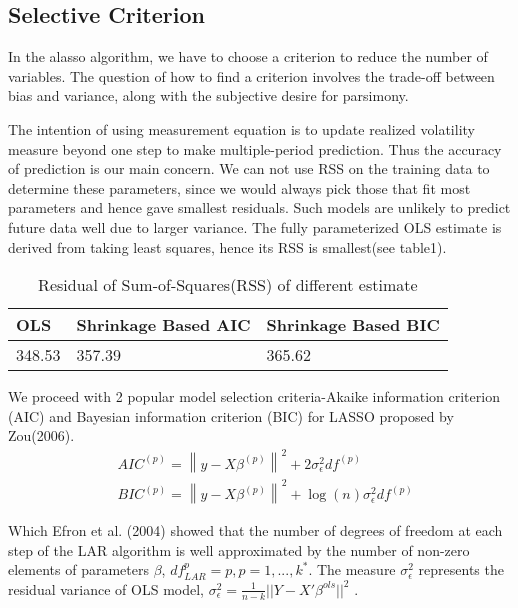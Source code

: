 \documentclass[titlepage,11pt]{article}
\begin{document}
\subsection{Selective Criterion}

In the alasso algorithm, we have to choose a criterion to reduce the number of variables. The question of how to find a criterion involves the trade-off between bias and variance, along with the subjective desire for parsimony. 

The intention of using measurement equation is to update realized volatility measure beyond one step to make multiple-period prediction. Thus the accuracy of prediction is our main concern. 
We can not use RSS on the training data to determine these parameters, since we would always pick those that fit most parameters and hence gave smallest residuals. Such models are unlikely to predict future data well due to larger variance. The fully parameterized OLS estimate is derived from taking least squares, hence its RSS is smallest(see table1). 
\begin{table} [!htbp]


\begin{tabular}{|p{4cm}|p{4cm}|p{4cm}|}
	  
	\hline OLS  & Shrinkage Based AIC  & Shrinkage Based BIC \\ 
	\hline 348.53  & 357.39 & 365.62 \\ 
	\hline 
\end{tabular} 
\captionsetup{justification=raggedright,singlelinecheck=false}
\caption{ Residual of Sum-of-Squares(RSS) of different estimate}
\label{RSS}
\end{table}


We proceed with 2 popular model selection criteria-Akaike information criterion (AIC) and  Bayesian information criterion (BIC) for LASSO proposed by Zou(2006). 
\begin{align}
& AIC^{(p)} = \left \| y-X\beta^ {(p)} \right \|^2 + 2\sigma_\epsilon ^2 df^{(p)}  \\
& BIC^{(p)} = \left \| y-X\beta^ {(p)} \right \|^2 + \log(n) \sigma_\epsilon ^2 df^{(p)}
\end{align}

Which Efron et al. (2004) showed that the number of degrees of freedom at each step of the LAR algorithm is well approximated by the number of non-zero elements of parameters $\beta$, $df_{LAR}^{p}=p, p=1,...,k^*$. The measure $\sigma_\epsilon^2$ represents the residual variance of OLS model, $\sigma_\epsilon^2=\frac{1}{n-k}||Y-X'\beta^{ols}||^2$ .
\end{document}
